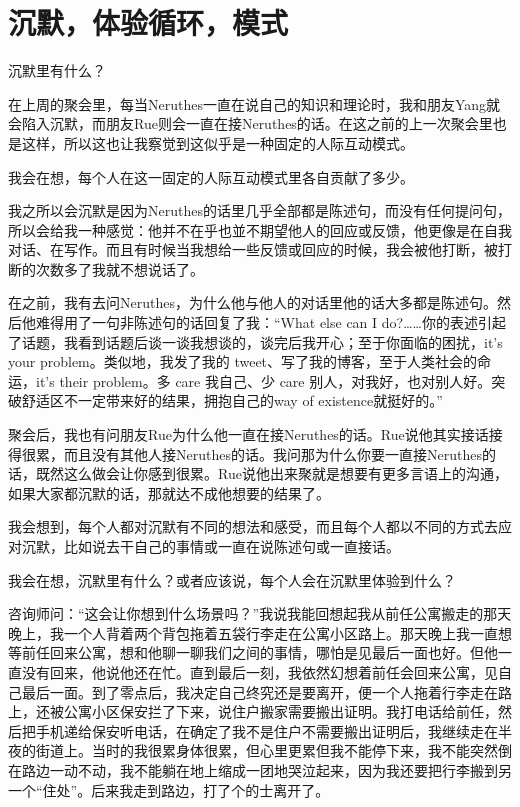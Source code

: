 \chapter{沉默，体验循环，模式}




沉默里有什么？

在上周的聚会里，每当Neruthes一直在说自己的知识和理论时，我和朋友Yang就会陷入沉默，而朋友Rue则会一直在接Neruthes的话。在这之前的上一次聚会里也是这样，所以这也让我察觉到这似乎是一种固定的人际互动模式。

我会在想，每个人在这一固定的人际互动模式里各自贡献了多少。

我之所以会沉默是因为Neruthes的话里几乎全部都是陈述句，而没有任何提问句，所以会给我一种感觉：他并不在乎也並不期望他人的回应或反馈，他更像是在自我对话、在写作。而且有时候当我想给一些反馈或回应的时候，我会被他打断，被打断的次数多了我就不想说话了。

在之前，我有去问Neruthes，为什么他与他人的对话里他的话大多都是陈述句。然后他难得用了一句非陈述句的话回复了我：“What else can I do?……你的表述引起了话题，我看到话题后谈一谈我想谈的，谈完后我开心；至于你面临的困扰，it's your problem。类似地，我发了我的 tweet、写了我的博客，至于人类社会的命运，it's their problem。多 care 我自己、少 care 别人，对我好，也对别人好。突破舒适区不一定带来好的结果，拥抱自己的way of existence就挺好的。”

聚会后，我也有问朋友Rue为什么他一直在接Neruthes的话。Rue说他其实接话接得很累，而且没有其他人接Neruthes的话。我问那为什么你要一直接Neruthes的话，既然这么做会让你感到很累。Rue说他出来聚就是想要有更多言语上的沟通，如果大家都沉默的话，那就达不成他想要的结果了。

我会想到，每个人都对沉默有不同的想法和感受，而且每个人都以不同的方式去应对沉默，比如说去干自己的事情或一直在说陈述句或一直接话。

我会在想，沉默里有什么？或者应该说，每个人会在沉默里体验到什么？

咨询师问：“这会让你想到什么场景吗？”我说我能回想起我从前任公寓搬走的那天晚上，我一个人背着两个背包拖着五袋行李走在公寓小区路上。那天晚上我一直想等前任回来公寓，想和他聊一聊我们之间的事情，哪怕是见最后一面也好。但他一直没有回来，他说他还在忙。直到最后一刻，我依然幻想着前任会回来公寓，见自己最后一面。到了零点后，我决定自己终究还是要离开，便一个人拖着行李走在路上，还被公寓小区保安拦了下来，说住户搬家需要搬出证明。我打电话给前任，然后把手机递给保安听电话，在确定了我不是住户不需要搬出证明后，我继续走在半夜的街道上。当时的我很累\pozhehao{}身体很累，但心里更累\pozhehao{}但我不能停下来，我不能突然倒在路边一动不动，我不能躺在地上缩成一团地哭泣起来，因为我还要把行李搬到另一个“住处”。后来我走到路边，打了个的士离开了。

